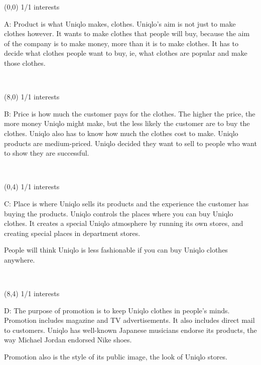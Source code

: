 \documentclass[a4paper]{article}
\newcommand{\mycard}[5]{%
	\vspace{0.1cm}
	\small #1 #2
	\par
	\parbox[t][6.7cm][c]{9.5cm}{%
	\hspace{0.1cm} \Large#3\\
	\normalsize#4 #5
	}
}
\begin{document}
\selectfont

\begin{textblock}{8}(0,0)
\mycard{1/1}{interests}{\parbox{9.0cm}{
A: Product is what Uniqlo makes, clothes. Uniqlo's aim is not just to make clothes however. It wants to make clothes that people will buy, because the aim of the company is to make money, more than it is to make clothes. It has to decide what clothes people want to buy, ie, what clothes are popular and make those clothes.
}}{}{} 
\end{textblock}

\begin{textblock}{8}(8,0)
\mycard{1/1}{interests}{\parbox{9.0cm}{
B: Price is how much the customer pays for the clothes. The higher the price, the more money Uniqlo might make, but the less likely the customer are to buy the clothes. Uniqlo also has to know how much the clothes cost to make.
Uniqlo products are medium-priced. Uniqlo decided they want to sell to people who want to show they are successful.
}}{}{} 
\end{textblock}

\begin{textblock}{8}(0,4)
\mycard{1/1}{interests}{\parbox{9.0cm}{
C: Place is where Uniqlo sells its products and the experience the customer has buying the products. Uniqlo controls the places where you can buy Uniqlo clothes. It creates a special Uniqlo atmosphere by running its own stores, and creating special places in department stores.

People will think Uniqlo is less fashionable if you can buy Uniqlo clothes anywhere.
}}{}{} 
\end{textblock}

\begin{textblock}{8}(8,4)
\mycard{1/1}{interests}{\parbox{9.0cm}{
D: The purpose of promotion is to keep Uniqlo clothes in people's minds. Promotion includes magazine and TV advertisements. It also includes direct mail to customers. Uniqlo has well-known Japanese musicians endorse its products, the way Michael Jordan endorsed Nike shoes.

Promotion also is the style of its public image, the look of Uniqlo stores.
}}{}{} 
\end{textblock}
\end{document}
